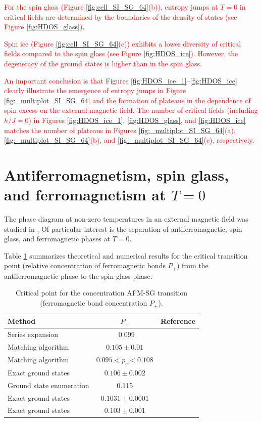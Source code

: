 \documentclass[preprint,12pt]{elsarticle}
\begin{document}
	\textcolor{red}{For the spin glass (Figure \ref{fig:cell_SI_SG_64}(b)), entropy jumps at $T = 0$ in critical fields are determined by the boundaries of the density of states (see Figure \ref{fig:HDOS_glass}).}
	
	\textcolor{red}{Spin ice (Figure \ref{fig:cell_SI_SG_64}(c)) exhibits a lower diversity of critical fields compared to the spin glass (see Figure \ref{fig:HDOS_ice}). However, the degeneracy of the ground states is higher than in the spin glass.}
	
	\textcolor{red}{An important conclusion is that Figures \ref{fig:HDOS_ice_1}–\ref{fig:HDOS_ice} clearly illustrate the emergence of entropy jumps in Figure \ref{fig:_multiplot_SI_SG_64} and the formation of plateaus in the dependence of spin excess on the external magnetic field.  
	The number of critical fields (including $h/J=0$) in Figures \ref{fig:HDOS_ice_1}, \ref{fig:HDOS_glass}, and \ref{fig:HDOS_ice} matches the number of plateaus in Figures \ref{fig:_multiplot_SI_SG_64}(a), \ref{fig:_multiplot_SI_SG_64}(b), and \ref{fig:_multiplot_SI_SG_64}(c), respectively.}
	
	
	\section{Antiferromagnetism, spin glass, and ferromagnetism at $T = 0$}
	
	The phase diagram at non-zero temperatures in an external magnetic field was studied in \cite{trukhin2024thermodynamic}. Of particular interest is the separation of antiferromagnetic, spin glass, and ferromagnetic phases at $T = 0$.
	
	Table \ref{tab:lit_phase} summarizes theoretical and numerical results for the critical transition point (relative concentration of ferromagnetic bonds $P_+$) from the antiferromagnetic phase to the spin glass phase.
	
	\begin{table}[!h]
		\centering
		\begin{tabular}{|l|c|l|}
			\hline
			Method & \( P_{+} \) & Reference \\ \hline
			Series expansion & ~0.099 & \cite{PhysRevB.19.260} \\ \hline
			Matching algorithm & \( 0.105 \pm 0.01 \) & \cite{H_Freund_1989} \\ \hline
			Matching algorithm & \( 0.095 < p_c < 0.108 \) & \cite{BENDISCH1994139} \\ \hline
			Exact ground states & \( 0.106 \pm 0.002 \) & \cite{N.Kawashima_1997} \\ \hline
			Ground state enumeration & 0.115 & \cite{PhysRevE.58.1502} \\ \hline
			Exact ground states & \( 0.1031 \pm 0.0001 \) & \cite{WANG200331} \\ \hline
			Exact ground states & \( 0.103 \pm 0.001 \) & \cite{amoruso2004domain} \\ \hline
		\end{tabular}
		\caption{Critical point for the concentration AFM-SG transition (ferromagnetic bond concentration $ P_+ $).}
		\label{tab:lit_phase}
	\end{table}
	
\end{document}
